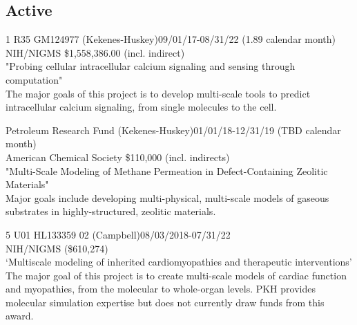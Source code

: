 \subsection{Active}
\vspace{-10pt}

1 R35 GM124977 (Kekenes-Huskey)\dapi \hfill 09/01/17-08/31/22 (1.89 calendar month) \\
NIH/NIGMS \hfill \$1,558,386.00 (incl. indirect) \\
"Probing cellular intracellular calcium signaling and sensing through computation"\\
The major goals of this project is to develop multi-scale tools to predict intracellular calcium signaling, from single molecules to the cell. %


Petroleum Research Fund (Kekenes-Huskey)\dapi   \hfill 01/01/18-12/31/19 (TBD calendar month)\\
American Chemical Society \hfill \$110,000 (incl. indirects) \\
"Multi-Scale Modeling of Methane Permeation in Defect-Containing Zeolitic Materials"\\
Major goals include developing multi-physical, multi-scale models of gaseous substrates in highly-structured, zeolitic materials. 


5	U01	HL133359	02 (Campbell)\dasig\hfill 08/03/2018-07/31/22\\
NIH/NIGMS \hfill (\$610,274) \\
`Multiscale modeling of inherited cardiomyopathies and therapeutic interventions'\\
The major goal of this project is to create multi-scale models of cardiac function and myopathies, from the molecular to whole-organ levels.  
PKH provides molecular simulation expertise but does not currently draw funds from this award.




